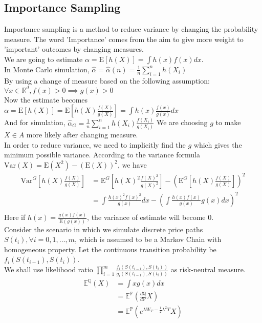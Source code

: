 \subsection{Importance Sampling}
Importance sampling is a method to reduce variance by changing the probability measure. The word 'Importance' comes from the aim to give more weight to 'important' outcomes by changing measures.\\
We are going to estimate $\alpha = \mathrm{E}[h(X)] = \int h(x)f(x) dx$.\\
In Monte Carlo simulation, $\hat{\alpha} = \hat{\alpha}(n) = \frac{1}{n} \sum_{i=1}^{n} h(X_{i})$\\
By using a change of measure based on the following assumption:
$\forall x \in \mathbb{R}^{d}, f(x) > 0 \implies g(x) > 0$\\
Now the estimate becomes $\alpha = \mathrm{E}[h(X)] = \mathrm{E}[h(X)\frac{f(X)}{g(X)}] = \int h(x)\frac{f(x)}{g(x)} dx$\\
And for simulation, $\hat{\alpha}_{G} = \frac{1}{n} \sum_{i=1}^{n} h(X_{i})\frac{f(X_{i})}{g(X_{i})}$
We are choosing $g$ to make ${X \in A}$ more likely after changing measure.\\
In order to reduce variance, we need to implicitly find the $g$ which gives the minimum possible variance. According to the variance formula $\mathrm{Var}(X) = \mathrm{E}(X^{2}) - (\mathrm{E}(X))^{2} $, we have\\
\begin{equation*}
\begin{split}
\mathrm{Var}^{G}[h(X)\frac{f(X)}{g(X)}] &= \mathrm{E}^{G}[h(X)^{2}\frac{f(X)^{2}}{g(X)^{2}}] - (\mathrm{E}^{G}[h(X)\frac{f(X)}{g(X)}])^{2}\\
&= \int \frac{h(x)^{2}f(x)^{2}}{g(x)} dx - (\int \frac{h(x)f(x)}{g(x)}g(x) dx)^{2}\\
\end{split}
\end{equation*}
Here if $h(x) = \frac{g(x)f(x)}{\mathrm{E}(g(x))}$, the variance of estimate will become 0.\\
Consider the scenario in which we simulate discrete price paths $S(t_{i}), \forall i = 0, 1, \dots, m$, which is assumed to be a Markov Chain with homogeneous property. Let the continuous transition probability be $f_{i}(S(t_{i-1}),S(t_{i}))$.\\[3mm]
We shall use likelihood ratio $\prod_{i=1}^{m} \frac{f_{i}(S(t_{i-1}),S(t_{i}))}{g_{i}(S(t_{i-1}),S(t_{i}))}$ as risk-neutral measure.
\begin{equation*}
\begin{split}
\mathbb{E}^{\mathbb{Q}}(X) 
&= \int x g(x) dx\\
&= \mathbb{E}^{\mathbb{P}}(\frac{d\mathbb{Q}}{d\mathbb{P}}X) \\
&= \mathbb{E}^{\mathbb{P}}(e^{\lambda W_{T} - \frac{1}{2}\lambda^{2}T}X) \\[7mm]
\end{split}
\end{equation*}
